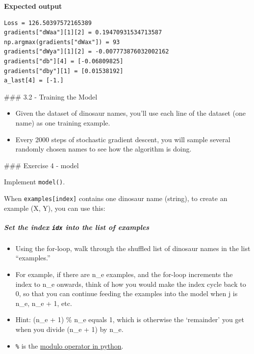 \documentclass[11pt]{article}
\providecommand{\tightlist}{%
      \setlength{\itemsep}{0pt}\setlength{\parskip}{0pt}}
\begin{document}
    \textbf{Expected output}

\begin{verbatim}
Loss = 126.50397572165389
gradients["dWaa"][1][2] = 0.19470931534713587
np.argmax(gradients["dWax"]) = 93
gradients["dWya"][1][2] = -0.007773876032002162
gradients["db"][4] = [-0.06809825]
gradients["dby"][1] = [0.01538192]
a_last[4] = [-1.]
\end{verbatim}

    \#\#\# 3.2 - Training the Model

    \begin{itemize}
\tightlist
\item
  Given the dataset of dinosaur names, you'll use each line of the
  dataset (one name) as one training example.
\item
  Every 2000 steps of stochastic gradient descent, you will sample
  several randomly chosen names to see how the algorithm is doing.
\end{itemize}

\#\#\# Exercise 4 - model

Implement \texttt{model()}.

When \texttt{examples{[}index{]}} contains one dinosaur name (string),
to create an example (X, Y), you can use this:

\hypertarget{set-the-index-idx-into-the-list-of-examples}{%
\subparagraph{\texorpdfstring{Set the index \texttt{idx} into the list
of
examples}{Set the index idx into the list of examples}}\label{set-the-index-idx-into-the-list-of-examples}}

\begin{itemize}
\tightlist
\item
  Using the for-loop, walk through the shuffled list of dinosaur names
  in the list ``examples.''
\item
  For example, if there are n\_e examples, and the for-loop increments
  the index to n\_e onwards, think of how you would make the index cycle
  back to 0, so that you can continue feeding the examples into the
  model when j is n\_e, n\_e + 1, etc.
\item
  Hint: (n\_e + 1) \% n\_e equals 1, which is otherwise the `remainder'
  you get when you divide (n\_e + 1) by n\_e.
\item
  \texttt{\%} is the
  \href{https://www.freecodecamp.org/news/the-python-modulo-operator-what-does-the-symbol-mean-in-python-solved/}{modulo
  operator in python}.
\end{itemize}
\end{document}
